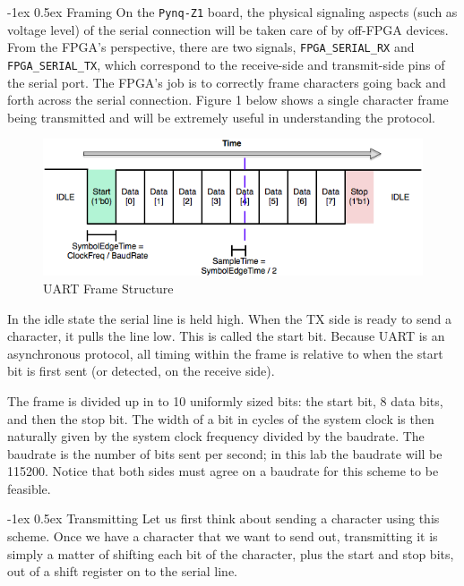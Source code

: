 \documentclass[11pt]{article}
\makeatletter
\renewcommand{\subsection}
{\@startsection {subsection}{1}{0pt}
 {-1ex}
 {0.5ex}
 {\bfseries\normalsize}}
\makeatother
\begin{document}
\subsection{Framing}
On the \verb|Pynq-Z1| board, the physical signaling aspects (such as voltage level) of the serial connection will be taken care of by off-FPGA devices. From the FPGA's perspective, there are two signals, \verb|FPGA_SERIAL_RX| and \verb|FPGA_SERIAL_TX|, which correspond to the receive-side and transmit-side pins of the serial port. The FPGA's job is to correctly frame characters going back and forth across the serial connection. Figure 1 below shows a single character frame being transmitted and will be extremely useful in understanding the protocol.

\begin{figure}[H]
  \centerline{\includegraphics[width=6in]{figs/uart_frame.png}}
  \caption{UART Frame Structure}
\end{figure}

In the idle state the serial line is held high. When the TX side is ready to send a character, it pulls the line low. This is called the start bit. Because UART is an asynchronous protocol, all timing within the frame is relative to when the start bit is first sent (or detected, on the receive side).

The frame is divided up in to 10 uniformly sized bits: the start bit, 8 data bits, and then the stop bit. The width of a bit in cycles of the system clock is then naturally given by the system clock frequency divided by the baudrate. The baudrate is the number of bits sent per second; in this lab the baudrate will be 115200. Notice that both sides must agree on a baudrate for this scheme to be feasible.

\subsection{Transmitting}
Let us first think about sending a character using this scheme. Once we have a character that we want to send out, transmitting it is simply a matter of shifting each bit of the character, plus the start and stop bits, out of a shift register on to the serial line.
\end{document}
